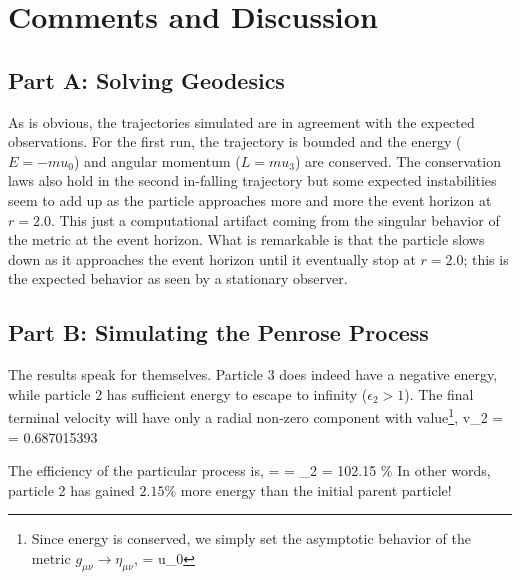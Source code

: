 \section{Comments and Discussion}
\label{Sec4}

\subsection{Part A: Solving Geodesics}
As is obvious, the trajectories simulated are in agreement with the expected observations. For the first run, the trajectory is bounded and the energy ($E = -mu_{0}$) and angular momentum ($L = mu_{3}$) are conserved. The conservation laws also hold in the second in-falling trajectory but some expected instabilities seem to add up as the particle approaches more and more the event horizon at $r=2.0$. This just a computational artifact coming from the singular behavior of the metric at the event horizon. What is remarkable is that the particle slows down as it approaches the event horizon until it eventually stop at $r=2.0$; this is the expected behavior as seen by a stationary observer.

\subsection{Part B: Simulating the Penrose Process}
The results speak for themselves. Particle 3 does indeed have a negative energy, while particle 2 has sufficient energy to escape to infinity ($\epsilon_2>1$). The final terminal velocity will have only a radial non-zero component with value\footnote{Since energy is conserved, we simply set the asymptotic behavior of the metric $g_{\mu\nu} \rightarrow \eta_{\mu\nu}$,
\be
	\epsilon = u_{0} \rightarrow {}
\ee },
\be
	v_{2\infty} =  = 0.687015393
\ee

The efficiency of the particular process is,
\be
	\eta =  = \mu_2 = 102.15 \%
\ee
In other words, particle 2 has gained $2.15 \%$ more energy than the initial parent particle!